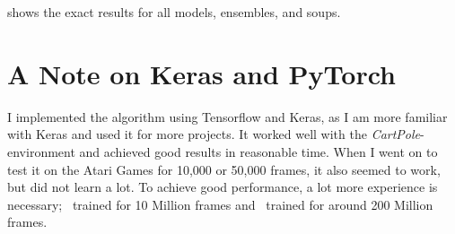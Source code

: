 \documentclass[a4paper,12pt,
headsepline,           %
oneside,               %
bibtotoc,              %
]{scrbook}
\begin{document}
 shows the exact results for all models, ensembles, and soups.




\clearpage
\thispagestyle{empty}

\clearpage
\restoregeometry


\chapter{A Note on Keras and PyTorch}\label{appendix:keras}

I implemented the algorithm using Tensorflow and Keras, as I am more familiar with Keras and used it for more projects. It worked well with the \emph{CartPole}-environment and achieved good results in reasonable time. When I went on to test it on the Atari Games for 10,000 or 50,000 frames, it also seemed to work, but did not learn a lot. To achieve good performance, a lot more experience is necessary;~\parencite{mnih_playing_2013} trained for 10 Million frames and~\parencite{van_hasselt_deep_2015} trained for around 200 Million frames.
\end{document}
